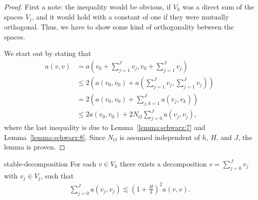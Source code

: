 \begin{proof}
  First a note: the inequality would be obvious, if $V_h$ was a direct
  sum of the spaces $V_j$, and it would hold with a constant of one if
  they were mutually orthogonal. Thus, we have to show some kind of
  orthogonality between the spaces.

  We start out by stating that
  \begin{align*}
    a(v,v) &= a\left(v_0+\sum_{j=1}^J v_j, v_0+\sum_{j=1}^J v_j\right)
    \\
    &\le 2 \left(a(v_0, v_0) + a\!\left(\sum_{j=1}^J v_j,\sum_{j=1}^J
        v_j\right)\right)
    \\
    &= 2 \left(a(v_0, v_0) + \sum_{j,k=1}^J a(v_j,v_k)\right) \\
    & \le 2 a(v_0, v_0) + 2 N_O \sum_{j=0}^J a(v_j, v_j),
  \end{align*}
  where the last inequality is due to Lemma~\ref{lemma:schwarz:7} and
  Lemma~\ref{lemma:schwarz:8}. Since $N_O$ is assumed independent of
  $h$, $H$, and $J$, the lemma is proven.
\end{proof}


\begin{Lemma}{stable-decomposition}
  \label{lemma:schwarz:stable-decomposition}
  For each $v\in V_h$ there exists a decomposition $v=\sum_{j=0}^J
  v_j$ with $v_j\in V_j$, such that
  \begin{gather}
    \label{eq:schwarz:13}
    \sum_{j=0}^J a(v_j, v_j)
    \lesssim \left(1+\frac H\delta\right)^2 a(v,v).
  \end{gather}
\end{Lemma}

